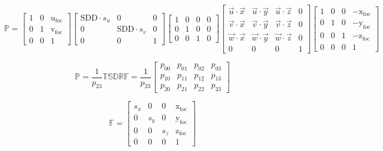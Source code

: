 \documentclass[10pt, a4paper, fleqn]{scrartcl}
\begin{document}
\begin{equation*}
\mathds{P}=
\begin{bmatrix}
1 & 0 & \text{u}_\text{foc} \\
0 & 1 & \text{v}_\text{foc} \\
0 & 0 & 1
\end{bmatrix}
\begin{bmatrix}
\text{SDD}\cdot s_u & 0 & 0 \\
0 & \text{SDD}\cdot s_v & 0 \\
0 & 0 & 1
\end{bmatrix}
\begin{bmatrix}
1 & 0 & 0 & 0 \\
0 & 1 & 0 & 0 \\
0 & 0 & 1 & 0
\end{bmatrix}
\begin{bmatrix}
\vec{u} \cdot \vec{x} & \vec{u} \cdot \vec{y} & \vec{u} \cdot \vec{z} & 0\\
\vec{v} \cdot \vec{x} & \vec{v} \cdot \vec{y} & \vec{v} \cdot \vec{z} & 0\\
\vec{w} \cdot \vec{x} & \vec{w} \cdot \vec{y} & \vec{w} \cdot \vec{z} & 0\\
0 & 0 & 0 & 1
\end{bmatrix}
\begin{bmatrix}
1 & 0 & 0 & -\text{x}_\text{foc} \\
0 & 1 & 0 & -\text{y}_\text{foc} \\
0 & 0 & 1 & -\text{z}_\text{foc} \\
0 & 0 & 0 & 1
\end{bmatrix}
\end{equation*}

\begin{equation*}
\mathds{P}=\frac{1}{p_{23}}\mathds{T}\mathds{S}\mathds{D}\mathds{R}\mathds{F} = \frac{1}{p_{23}} \begin{bmatrix}
p_{00} & p_{01} & p_{02} & p_{03} \\
p_{10} & p_{11} & p_{12} & p_{13} \\
p_{20} & p_{21} & p_{22} & p_{23}
\end{bmatrix}
\end{equation*}


\begin{equation*}
\mathds{F}=\begin{bmatrix}
s_x & 0 & 0 & \text{x}_\text{foc} \\
0 & s_y & 0 & \text{y}_\text{foc} \\
0 & 0 & s_z & \text{z}_\text{foc} \\
0 & 0 & 0 & 1
\end{bmatrix}
\end{equation*}
\end{document}
